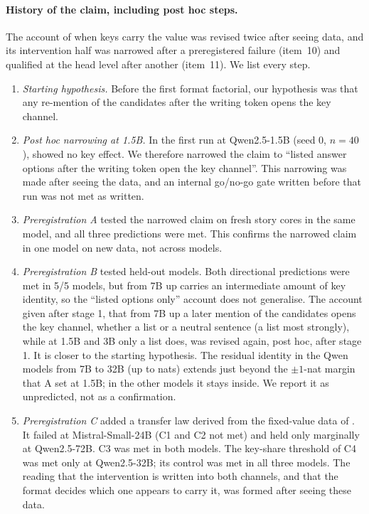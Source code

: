 \paragraph{History of the claim, including post hoc steps.}
The account of when keys carry the value was revised twice after seeing data, and its intervention half was narrowed after a preregistered failure (item~10) and qualified at the head level after another (item~11). We list every step.
\begin{enumerate}\setlength\itemsep{1pt}
  \item \emph{Starting hypothesis.} Before the first format factorial, our hypothesis was that any re-mention of the candidates after the writing token opens the key channel.
  \item \emph{Post hoc narrowing at 1.5B.} In the first run at Qwen2.5-1.5B (seed 0, $n = 40$), \fmtPost{} showed no key effect. We therefore narrowed the claim to ``listed answer options after the writing token open the key channel''. This narrowing was made after seeing the data, and an internal go/no-go gate written before that run was not met as written.
  \item \emph{Preregistration A} tested the narrowed claim on fresh story cores in the same model, and all three predictions were met. This confirms the narrowed claim in one model on new data, not across models.
  \item \emph{Preregistration B} tested held-out models. Both directional predictions were met in 5/5 models, but from 7B up \fmtPost{} carries an intermediate amount of key identity, so the ``listed options only'' account does not generalise. The account given after stage 1, that from 7B up a later mention of the candidates opens the key channel, whether a list or a neutral sentence (a list most strongly), while at 1.5B and 3B only a list does, was revised again, post hoc, after stage 1. It is closer to the starting hypothesis. The residual \fmtNone{} identity in the Qwen models from 7B to 32B (up to \noneMax{} nats) extends just beyond the $\pm 1$-nat margin that A set at 1.5B; in the other models it stays inside. We report it as unpredicted, not as a confirmation.
  \item \emph{Preregistration C} added a transfer law derived from the fixed-value data of \citet{anonymous2026fitted}. It failed at Mistral-Small-24B (C1 and C2 not met) and held only marginally at Qwen2.5-72B. C3 was met in both models. The key-share threshold of C4 was met only at Qwen2.5-32B; its \fmtBefore{} control was met in all three models. The reading that the intervention is written into both channels, and that the format decides which one appears to carry it, was formed after seeing these data.

\end{enumerate}

